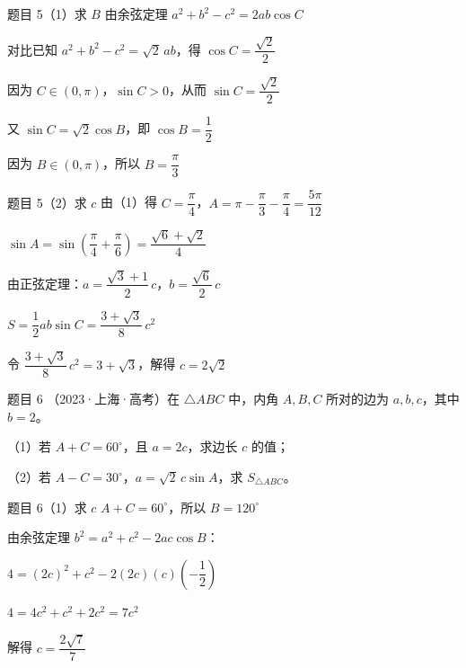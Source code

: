 \documentclass[UTF8]{ctexbeamer}
\begin{document}
	\begin{frame}{题目 5（1）\quad 求 $B$}
		由余弦定理 $a^2 + b^2 - c^2 = 2ab\cos C$
		\pause
		
		对比已知 $a^2 + b^2 - c^2 = \sqrt{2}\,ab$，得 $\cos C = \dfrac{\sqrt{2}}{2}$
		\pause
		
		因为 $C \in (0, \pi)$，$\sin C > 0$，从而 $\sin C = \dfrac{\sqrt{2}}{2}$
		\pause
		
		又 $\sin C = \sqrt{2}\cos B$，即 $\cos B = \dfrac{1}{2}$
		\pause
		
		因为 $B \in (0, \pi)$，所以 $B = \dfrac{\pi}{3}$
	\end{frame}
	
	\begin{frame}{题目 5（2）\quad 求 $c$}
		由（1）得 $C = \dfrac{\pi}{4}$，$A = \pi - \dfrac{\pi}{3} - \dfrac{\pi}{4} = \dfrac{5\pi}{12}$
		\pause
		
		$\sin A = \sin\!\left(\dfrac{\pi}{4} + \dfrac{\pi}{6}\right) = \dfrac{\sqrt{6} + \sqrt{2}}{4}$
		\pause
		
		由正弦定理：$a = \dfrac{\sqrt{3}+1}{2}\,c$，$b = \dfrac{\sqrt{6}}{2}\,c$
		\pause
		
		$S = \dfrac{1}{2}ab\sin C = \dfrac{3+\sqrt{3}}{8}\,c^2$
		\pause
		
		令 $\dfrac{3+\sqrt{3}}{8}\,c^2 = 3+\sqrt{3}$，解得 $c = 2\sqrt{2}$
	\end{frame}
	
	\begin{frame}{题目 6}
		（2023·上海·高考）在 $\triangle ABC$ 中，内角 $A, B, C$ 所对的边为 $a, b, c$，其中 $b = 2$。
		
		\vspace{0.3cm}
		（1）若 $A + C = 60^\circ$，且 $a = 2c$，求边长 $c$ 的值；
		
		（2）若 $A - C = 30^\circ$，$a = \sqrt{2}\,c\sin A$，求 $S_{\triangle ABC}$。
	\end{frame}
	
	\begin{frame}{题目 6（1）\quad 求 $c$}
		$A + C = 60^\circ$，所以 $B = 120^\circ$
		\pause
		
		由余弦定理 $b^2 = a^2 + c^2 - 2ac\cos B$：
		\pause
		
		$4 = (2c)^2 + c^2 - 2(2c)(c)\!\left(-\dfrac{1}{2}\right)$
		\pause
		
		$4 = 4c^2 + c^2 + 2c^2 = 7c^2$
		\pause
		
		解得 $c = \dfrac{2\sqrt{7}}{7}$
	\end{frame}
	
\end{document}
